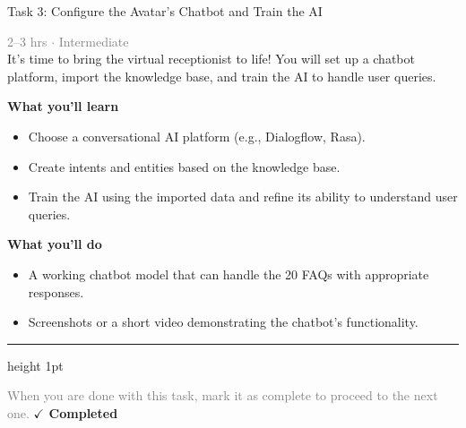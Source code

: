 \documentclass[10pt,a4paper]{article}
\begin{document}
\begin{taskbox}{Task 3: Configure the Avatar’s Chatbot and Train the AI}

    {\small \textcolor{gray}{2--3 hrs $\cdot$ Intermediate}}\\[12pt]

      
It’s time to bring the virtual receptionist to life! You will set up a chatbot platform, import the knowledge base, and train the AI to handle user queries.


\vspace{8pt}
{\large \textbf{\textcolor{brandLight}{What you'll learn}}}\\[4pt]  
\begin{itemize}
    \item Choose a conversational AI platform (e.g., Dialogflow, Rasa).  
    \item Create intents and entities based on the knowledge base.  
    \item Train the AI using the imported data and refine its ability to understand user queries.  
\end{itemize}

\vspace{8pt}
{\large \textbf{\textcolor{brandLight}{What you'll do}}}\\[4pt]  
\begin{itemize}
    \item A working chatbot model that can handle the 20 FAQs with appropriate responses.  
    \item Screenshots or a short video demonstrating the chatbot’s functionality.\par
\end{itemize}

    \vspace{16pt}

    \textcolor{cardBorder}{\hrule height 1pt}\vspace{8pt}

    \small \textcolor{gray}{When you are done with this task, mark it as complete to proceed to the next one.} \hfill \textbf{\textcolor{brandDark}{$\checkmark$ Completed}}

\end{taskbox}
\end{document}
